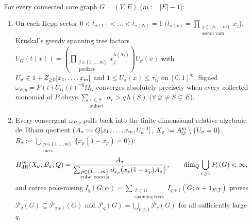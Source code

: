 \begin{theorem}
\label{thm:core-stabilization}
For every connected core graph $G = (V,E)$ ($m := |E|-1$):
\begin{enumerate}[label=(\arabic*),leftmargin=*]
  \item On each Hepp sector $0 < t_{\sigma(1)} < \dots < t_{\sigma(N)} = 1$ ($t_{\sigma(p)} = \prod_{\substack{j\in\{p,\dots,m\}\\\mathrm{sector\ vars}}}x_j$), Kruskal's greedy spanning tree factors $U_G(t(x)) = (\prod_{\substack{j\in\{1,\dots,m\}\\\mathrm{prefixes}}}x_j^{h(S_j)})U_\sigma(x)$ with $U_\sigma \in 1 + Z_{\ge 0}[x_1,\dots,x_m]$ and $1 \le U_\sigma(x) \le \tau_G$ on $[0,1]^m$. Signed $\omega_{P,q} = P(t)U_G(t)^{-q}\Omega_G$ converges absolutely precisely when every collected monomial of $P$ obeys $\sum_{\substack{e\in S\\\mathrm{subset}}}\alpha_e > q\,h(S)$ ($\forall\,\varnothing\neq S\subsetneq E$).

  \item Every convergent $\omega_{P,q}$ pulls back into the finite-dimensional relative algebraic de~Rham quotient ($A_\sigma := Q[x_1,\dots,x_m, U_\sigma^{-1}]$, $X_\sigma := A^m_{Q}\setminus\{U_\sigma=0\}$, $B_\sigma := \bigcup_{\substack{p\in\{1,\dots,m\}\\\mathrm{faces}}}\{x_p(1-x_p)=0\}$):
  \begin{equation}
  \label{eq:rel-dr-quotient}
  H^m_{\mathrm{dR}}(X_\sigma, B_\sigma; \QQ) = \frac{A_\sigma}{\sum_{\substack{p\in\{1,\dots,m\}\\\mathrm{cube\ coords}}}\partial_{x_p}\bigl(x_p(1-x_p)A_\sigma\bigr)},\qquad
  \dim_{\QQ}\bigcup_{r\ge 1}\mathcal{P}_r(G) < \infty,
  \end{equation}
  and cotree pole-raising $I_q(G;\alpha) = \sum_{\substack{T\subset G\\\mathrm{spanning\ trees}}}I_{q+1}(G;\alpha + \mathbf{1}_{E\setminus T})$ proves $\mathcal{P}_q(G) \subseteq \mathcal{P}_{q+1}(G)$ and $\mathcal{P}_q(G) = \bigcup_{r\ge 1}\mathcal{P}_r(G)$ for all sufficiently large $q$.
\end{enumerate}
\end{theorem}

